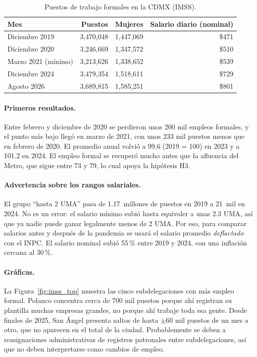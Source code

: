 \begin{table}[h]
\centering
\caption{Puestos de trabajo formales en la CDMX (IMSS).}\label{tab:imss}
\small
\begin{tabular}{lrrr}
\toprule
\textbf{Mes} & \textbf{Puestos} & \textbf{Mujeres} & \textbf{Salario diario (nominal)}\\
\midrule
Diciembre 2019 & 3,470,048 & 1,447,069 & \$471\\
Diciembre 2020 & 3,246,669 & 1,347,572 & \$510\\
Marzo 2021 (mínimo) & 3,213,626 & 1,338,652 & \$539\\
Diciembre 2024 & 3,479,354 & 1,518,611 & \$729\\
Agosto 2026 & 3,689,815 & 1,585,251 & \$801\\
\bottomrule
\end{tabular}
\end{table}

\paragraph{Primeros resultados.} Entre febrero y diciembre de 2020 se perdieron unos 200 mil
empleos formales, y el punto más bajo llegó en marzo de 2021, con unos 233 mil puestos menos que en
febrero de 2020. El promedio anual volvió a 99.6 (2019 = 100) en 2023 y a 101.2 en 2024. El
empleo formal se recuperó mucho antes que la afluencia del Metro, que sigue entre 73 y 79, lo cual
apoya la hipótesis H3.

\paragraph{Advertencia sobre los rangos salariales.} El grupo \enquote{hasta 2 UMA} pasa de
1.17~millones de puestos en 2019 a 21~mil en 2024. No es un error: el salario mínimo subió hasta
equivaler a unas 2.3 UMA, así que ya nadie puede ganar legalmente menos de 2 UMA. Por eso, para
comparar salarios antes y después de la pandemia se usará el salario promedio \emph{deflactado}
con el INPC. El salario nominal subió 55\,\% entre 2019 y 2024, con una inflación cercana al 30\,\%.

\paragraph{Gráficas.} La Figura~\ref{fig:imss_top} muestra las cinco subdelegaciones con más empleo
formal. Polanco concentra cerca de 700 mil puestos porque ahí registran su plantilla muchas empresas
grandes, no porque ahí trabaje toda esa gente. Desde finales de 2025, San Ángel presenta saltos de
hasta $\pm$60 mil puestos de un mes a otro, que no aparecen en el total de la ciudad. Probablemente se
deben a reasignaciones administrativas de registros patronales entre subdelegaciones, así que no deben
interpretarse como cambios de empleo.

